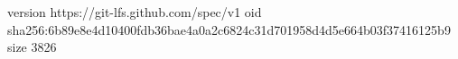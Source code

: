 version https://git-lfs.github.com/spec/v1
oid sha256:6b89e8e4d10400fdb36bae4a0a2c6824c31d701958d4d5e664b03f37416125b9
size 3826
